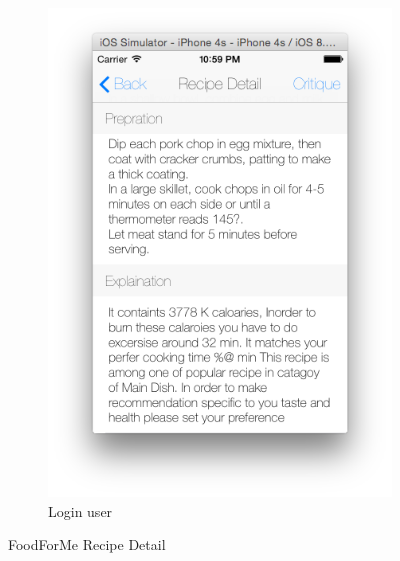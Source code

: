 \begin{figure}[h]
\begin{subfigure}{.32\textwidth}
	  		\includegraphics[width=.9\linewidth]{figures/ch4_app_screen_shots/recipe_detail/recipe_detail_3.png}
	  		\caption{Login user}
		  	\end{subfigure}
	  	\caption{FoodForMe Recipe Detail}
	  	\label{fig:foodforme_main_menu_sreen}
	  \end{figure}
%

